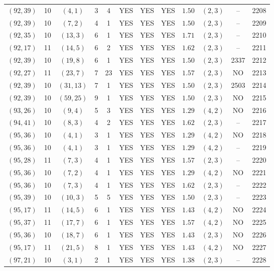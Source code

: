 \begin{longtable}{|c|c|c|c|c|c|c|c|c|c|c|c|}
$(92,39)$ & 10 & $(4,1)$ & 3 & 4 & YES & YES & YES & $1.50$ & $(2,3)$ & -- & 2208\\
$(92,39)$ & 10 & $(7,2)$ & 4 & 1 & YES & YES & YES & $1.50$ & $(2,3)$ & -- & 2209\\
$(92,35)$ & 10 & $(13,3)$ & 6 & 1 & YES & YES & YES & $1.71$ & $(2,3)$ & -- & 2210\\
$(92,17)$ & 11 & $(14,5)$ & 6 & 2 & YES & YES & YES & $1.62$ & $(2,3)$ & -- & 2211\\
$(92,39)$ & 10 & $(19,8)$ & 6 & 1 & YES & YES & YES & $1.50$ & $(2,3)$ & 2337 & 2212\\
$(92,27)$ & 11 & $(23,7)$ & 7 & 23 & YES & YES & YES & $1.57$ & $(2,3)$ & NO & 2213\\
$(92,39)$ & 10 & $(31,13)$ & 7 & 1 & YES & YES & YES & $1.50$ & $(2,3)$ & 2503 & 2214\\
$(92,39)$ & 10 & $(59,25)$ & 9 & 1 & YES & YES & YES & $1.50$ & $(2,3)$ & NO & 2215\\
$(93,26)$ & 10 & $(9,4)$ & 5 & 3 & YES & YES & YES & $1.29$ & $(4,2)$ & NO & 2216\\
$(94,41)$ & 10 & $(8,3)$ & 4 & 2 & YES & YES & YES & $1.62$ & $(2,3)$ & -- & 2217\\
$(95,36)$ & 10 & $(4,1)$ & 3 & 1 & YES & YES & YES & $1.29$ & $(4,2)$ & NO & 2218\\
$(95,36)$ & 10 & $(4,1)$ & 3 & 1 & YES & YES & YES & $1.29$ & $(4,2)$ & -- & 2219\\
$(95,28)$ & 11 & $(7,3)$ & 4 & 1 & YES & YES & YES & $1.57$ & $(2,3)$ & -- & 2220\\
$(95,36)$ & 10 & $(7,2)$ & 4 & 1 & YES & YES & YES & $1.29$ & $(4,2)$ & NO & 2221\\
$(95,36)$ & 10 & $(7,3)$ & 4 & 1 & YES & YES & YES & $1.62$ & $(2,3)$ & -- & 2222\\
$(95,39)$ & 10 & $(10,3)$ & 5 & 5 & YES & YES & YES & $1.50$ & $(2,3)$ & -- & 2223\\
$(95,17)$ & 11 & $(14,5)$ & 6 & 1 & YES & YES & YES & $1.43$ & $(4,2)$ & NO & 2224\\
$(95,37)$ & 11 & $(17,7)$ & 6 & 1 & YES & YES & YES & $1.57$ & $(4,2)$ & NO & 2225\\
$(95,36)$ & 10 & $(18,7)$ & 6 & 1 & YES & YES & YES & $1.43$ & $(2,3)$ & NO & 2226\\
$(95,17)$ & 11 & $(21,5)$ & 8 & 1 & YES & YES & YES & $1.43$ & $(4,2)$ & NO & 2227\\
$(97,21)$ & 10 & $(3,1)$ & 2 & 1 & YES & YES & YES & $1.38$ & $(2,3)$ & -- & 2228\\

\end{longtable}
